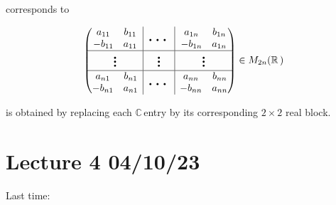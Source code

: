 \documentclass[12pt,a4paper]{article}
\newcommand{\rR}{\ensuremath{\mathbb{R}\,}}
\newcommand{\cC}{\ensuremath{\mathbb{C}\,}}
\newcommand{\mr}[1]{\ensuremath{M_{#1}(\rR)\,}}
\newcommand{\rvline}{\hspace*{-\arraycolsep}\vline\hspace*{-\arraycolsep}}
\newcommand{\bigld}{\mbox{\normalfont\Large\bfseries \ldots}}
\newcommand{\bigvd}{\mbox{\normalfont\Large\bfseries \vdots}}
\begin{document}
corresponds to

\[
\begin{pmatrix}
  \begin{matrix}
  a_{11} & b_{11}  \\
  -b_{11} &   a_{11}
  \end{matrix}
  & \rvline & \bigld  & \rvline &
  \begin{matrix}
  a_{1n} & b_{1n}  \\
  -b_{1n} &   a_{1n}
  \end{matrix}  
  \\
\hline

  \bigvd
  & \rvline & \bigvd  & \rvline &
  \bigvd
  \\
\hline
    \begin{matrix}
  a_{n1} & b_{n1}  \\
  -b_{n1} &   a_{n1}
  \end{matrix}
  & \rvline & \bigld  & \rvline &
  \begin{matrix}
  a_{nn} & b_{nn}  \\
  -b_{nn} &   a_{nn}
  \end{matrix}  
\end{pmatrix} \in \mr{2n}
\]

 is obtained by replacing each \cC entry by its corresponding $2\times 2$ real block.

\section{Lecture 4 04/10/23}
Last time:
\end{document}
